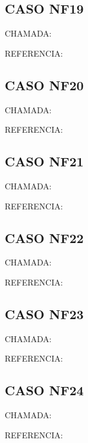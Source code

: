 \documentclass{undftex}
\begin{document}
\begin{refsection}\section*{CASO NF19}\noindent CHAMADA: \par\noindent REFERENCIA:\par\printbibliography[heading=none]\end{refsection}\clearpage
\begin{refsection}\section*{CASO NF20}\noindent CHAMADA: \par\noindent REFERENCIA:\par\printbibliography[heading=none]\end{refsection}\clearpage
\begin{refsection}\section*{CASO NF21}\noindent CHAMADA: \par\noindent REFERENCIA:\par\printbibliography[heading=none]\end{refsection}\clearpage
\begin{refsection}\section*{CASO NF22}\noindent CHAMADA: \par\noindent REFERENCIA:\par\printbibliography[heading=none]\end{refsection}\clearpage
\begin{refsection}\section*{CASO NF23}\noindent CHAMADA: \par\noindent REFERENCIA:\par\printbibliography[heading=none]\end{refsection}\clearpage
\begin{refsection}\section*{CASO NF24}\noindent CHAMADA: \par\noindent REFERENCIA:\par\printbibliography[heading=none]\end{refsection}\clearpage
\end{document}
